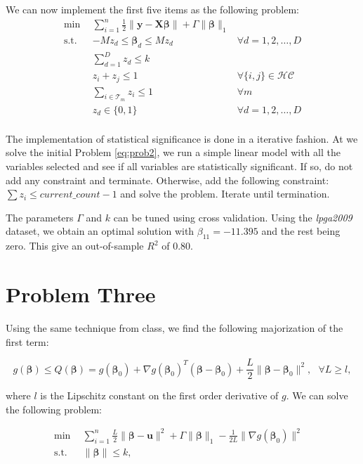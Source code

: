 \documentclass[12pt]{article}
\newcommand{\M}{\mathbf}
\newcommand{\B}{\boldsymbol}
\newcommand{\1}{\mathds{1}}
\begin{document}
We can now implement the first five items as the following problem:
\begin{equation}
\begin{aligned}
\min ~~&\sum_{i=1}^n \frac{1}{2}\|\M y-\M X \B\beta\| + \Gamma \|\B\beta \|_1 &\\
\textrm{s.t.} ~~& -M z_d \leq \B\beta_d \leq M z_d 	& \forall d=1, 2, \ldots, D\\
			 & \sum_{d=1}^D z_d \leq k &\\
			 & z_i + z_j \leq 1 &\forall \{i, j\} \in \mathcal{HC} \\
			 & \sum_{i\in \mathcal{T}_m} z_i\leq 1 &\forall m \\
			 & z_d \in \{0,1\}  	& \forall d=1, 2, \ldots, D\\
\end{aligned}\label{eq:prob2}
\end{equation}

The implementation of statistical significance is done in a iterative fashion. At we solve the initial Problem \ref{eq:prob2}, we run a simple linear model with all the variables selected and see if all variables are statistically significant. If so, do not add any constraint and terminate. Otherwise, add the following constraint:
$\sum z_i \leq current\_count - 1$ and solve the problem. Iterate until termination.

The parameters $\Gamma$ and $k$ can be tuned using cross validation. Using the \textit{lpga2009} dataset, we obtain an optimal solution with $\beta_11 = -11.395$ and the rest being zero. This give an out-of-sample $R^2$ of $0.80$.


\section{Problem Three}
Using the same technique from class, we find the following majorization of the first term:

\begin{equation}
g(\B\beta) \leq Q(\B\beta) = g(\B\beta_0) + \nabla g(\B\beta_0)^T (\B\beta - \B\beta_0) + \frac{L}{2} \| \B\beta - \B\beta_0\|^2,~~~\forall L \geq l,
\end{equation}

where $l$ is the Lipschitz constant on the first order derivative of $g$. We can solve the following problem:

\begin{equation}
\begin{aligned}
\min ~~&\sum_{i=1}^n \frac{L}{2}\|\B\beta - \M u\|^2  + \Gamma \| \B\beta\|_1 -\frac{1}{2L} \|\nabla g(\B\beta_0) \|^2&\\
\textrm{s.t.} ~~& \|\B\beta\| \leq k,
\end{aligned}\label{eq:prob2}
\end{equation}
\end{document}
